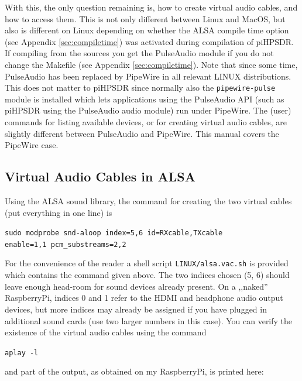 \documentclass[12pt]{book}
\def\grtt#1{\texttt{\color{magenta}#1}}
\def\pH{pi\-HPSDR\xspace}
\begin{document}
With this, the only question remaining is, how to create virtual audio cables, and how to access them.
This is not only different between Linux and MacOS, but also is different on Linux depending on
whether the ALSA compile time option (see Appendix \ref{sec:compiletime}) was activated during
compilation of \pH. If compiling from the sources you get the PulseAudio module if you
do not change the Makefile (see Appendix \ref{sec:compiletime}). Note that since some time,
PulseAudio has been replaced by PipeWire in all relevant LINUX distributions. This does not matter
to \pH since normally also the \texttt{pipewire-pulse} module is installed which
lets applications using the PulseAudio API (such as \pH using the PulseAudio audio module)
run under PipeWire.
 The (user) commands for
listing available devices, or for creating virtual audio cables, are slightly different between
PulseAudio and PipeWire. This manual covers the PipeWire case.


\subsection[ALSA: Virtual Audio Cables]{Virtual Audio Cables in ALSA}
Using the ALSA sound library,
the command for creating the two virtual cables (put everything in one line) is

\grtt{sudo modprobe snd-aloop index=5,6 id=RXcable,TXcable\\
enable=1,1 pcm\_substreams=2,2}

For the convenience of the reader a shell script \texttt{LINUX/alsa.vac.sh} is
provided which contains the command given above.
The two indices chosen (5, 6) should leave enough head-room for sound devices
already present. On a ,,naked'' RaspberryPi, indices 0 and 1 refer to the HDMI
and headphone audio output devices, but more indices may already be assigned
if you have plugged in additional sound cards (use two larger numbers in
this case). You can verify the existence of
the virtual audio cables using the command

\grtt{aplay -l}

and part of the output, as obtained on my RaspberryPi, is printed here:
\end{document}
